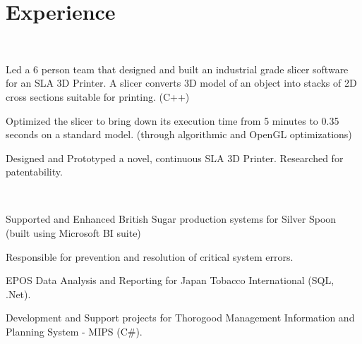 \documentclass[]{deedy-resume-openfont}
\begin{document}
\begin{minipage}[t]{0.66\textwidth} 



\section{Experience}

\\
\vspace{\topsep}
\begin{tightemize}
\item  Led a 6 person team that designed and built an industrial grade slicer software for an SLA 3D Printer. A slicer converts 3D model of an object into stacks of 2D cross sections suitable for printing. (C++)
\item Optimized the slicer to bring down its execution time from 5 minutes to 0.35 seconds on a standard model. (through algorithmic and OpenGL optimizations)
\item Designed and Prototyped a novel, continuous SLA 3D Printer. Researched for patentability.
\end{tightemize}

\sectionsep{}

\\
\vspace{\topsep} %
\begin{tightemize}
\item Supported and Enhanced British Sugar production systems for Silver Spoon (built using Microsoft BI suite)
	\item Responsible for prevention and resolution of critical system errors.  
	\item EPOS Data Analysis and Reporting for Japan Tobacco International (SQL, .Net).
	\item Development and Support projects for Thorogood Management Information and Planning System - MIPS (C\#).
\end{tightemize}
\sectionsep




\end{minipage}
\end{document}
